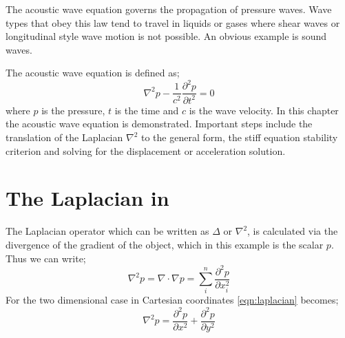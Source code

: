 
%
%
%

The acoustic wave equation governs the propagation of pressure waves. Wave
types that obey this law tend to travel in liquids or gases where shear waves
or longitudinal style wave motion is not possible. An obvious example is sound
waves.

The acoustic wave equation is defined as;
\begin{equation}
 \nabla ^2 p - \frac{1}{c^2} \frac{\partial ^2 p}{\partial t^2} = 0
\label{eqn:acswave}
\end{equation}
where $p$ is the pressure, $t$ is the time and $c$ is the wave velocity. In this
chapter the acoustic wave equation is demonstrated. Important steps include the
translation of the Laplacian $\nabla^2$ to the \esc general form, the stiff
equation stability criterion and solving for the displacement or acceleration solution.

\section{The Laplacian in \esc}
The Laplacian operator which can be written as $\Delta$ or $\nabla^2$,  is
calculated via the divergence of the gradient of the object, which in this
example is the scalar $p$. Thus we can write;
\begin{equation}
 \nabla^2 p = \nabla \cdot \nabla p = 
	\sum_{i}^n
	\frac{\partial^2 p}{\partial x^2_{i}}
 \label{eqn:laplacian}
\end{equation}
For the two dimensional case in Cartesian coordinates \autoref{eqn:laplacian}
becomes;
\begin{equation}
 \nabla^2 p = \frac{\partial^2 p}{\partial x^2} 
		   + \frac{\partial^2 p}{\partial y^2}
\end{equation}

